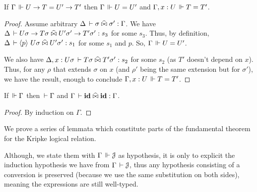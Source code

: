 \documentclass[a4paper,english]{lipics-utf8x}
\begin{document}
  \begin{lemma}
    \label{lem:fun-inj-valid}
    If $\Gamma \,\Vdash U \to T = U' \to T'$ then $\Gamma \,\Vdash U = U'$ and
    $\Gamma, x:U \,\Vdash T = T'$.
  \end{lemma}

  \begin{proof}
    Assume arbitrary $\Delta \,\vdash \sigma \mathrel{\widehat{\bowtie}} \sigma' : \Gamma$.
    We have
    $\Delta \,\vdash U \sigma \to T\sigma \mathrel{\widehat{\bowtie}} U'\sigma' \to T' \sigma' : s_3$
    for some $s_3$. Thus, by definition,
    $\Delta \,\vdash \langle p \rangle~ U \sigma \mathrel{\widehat{\bowtie}} U' \sigma' : s_1$ for some $s_1$ and
    $p$. So, $\Gamma \,\Vdash U = U'$.

    We also have
    $\Delta, x:U\sigma \,\vdash T \sigma \mathrel{\widehat{\bowtie}} T'\sigma' : s_2$ for some $s_2$
    (as $T'$ doesn't depend on $x$).
    Thus, for any $\rho$ that extends $\sigma$ on $x$ (and $\rho'$ being the
    same extension but for $\sigma'$), we have the result,
    enough to conclude $\Gamma, x:U \,\Vdash T = T'$.
  \end{proof}

  \begin{lemma}
    If $\,\Vdash \Gamma$ then $\,\vdash \Gamma$ and $\Gamma \,\vdash \operatorname{\mathbf{id}} \mathrel{\widehat{\bowtie}} \operatorname{\mathbf{id}} : \Gamma$.
  \end{lemma}

  \begin{proof}
    By induction on $\Gamma$.
  \end{proof}

  We prove a series of lemmata which constitute parts of the fundamental theorem
  for the Kripke logical relation.

  Although, we state them with $\Gamma \,\Vdash \mathcal{J}$ as hypothesis,
  it is only to explicit the induction hypothesis we have from
  $\Gamma \,\vdash \mathcal{J}$, thus any hypothesis consisting of a conversion
  is preserved (because we use the same substitution on both sides),
  meaning the expressions are still well-typed.

  \begin{lemma}
    \leavevmode
    \begin{mathc}
    \end{mathc}
  \end{lemma}
\end{document}
